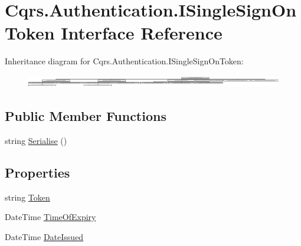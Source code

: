 \hypertarget{interfaceCqrs_1_1Authentication_1_1ISingleSignOnToken}{}\section{Cqrs.\+Authentication.\+I\+Single\+Sign\+On\+Token Interface Reference}
\label{interfaceCqrs_1_1Authentication_1_1ISingleSignOnToken}
Inheritance diagram for Cqrs.\+Authentication.\+I\+Single\+Sign\+On\+Token\+:\begin{figure}[H]
\begin{center}
\leavevmode
\includegraphics[height=0.534096cm]{interfaceCqrs_1_1Authentication_1_1ISingleSignOnToken}
\end{center}
\end{figure}
\subsection*{Public Member Functions}
\begin{DoxyCompactItemize}
\item 
string \hyperlink{interfaceCqrs_1_1Authentication_1_1ISingleSignOnToken_af34e8c0b052865d687064d3381bfbcdb_af34e8c0b052865d687064d3381bfbcdb}{Serialise} ()
\end{DoxyCompactItemize}
\subsection*{Properties}
\begin{DoxyCompactItemize}
\item 
string \hyperlink{interfaceCqrs_1_1Authentication_1_1ISingleSignOnToken_aba74aff1a43375dce8d80fa94a94a57b_aba74aff1a43375dce8d80fa94a94a57b}{Token}
\item 
Date\+Time \hyperlink{interfaceCqrs_1_1Authentication_1_1ISingleSignOnToken_a50af484569cc78f88acb01f1938a7cd8_a50af484569cc78f88acb01f1938a7cd8}{Time\+Of\+Expiry}
\item 
Date\+Time \hyperlink{interfaceCqrs_1_1Authentication_1_1ISingleSignOnToken_a0c41d76beea893838e556fba8dbc59db_a0c41d76beea893838e556fba8dbc59db}{Date\+Issued}
\end{DoxyCompactItemize}


